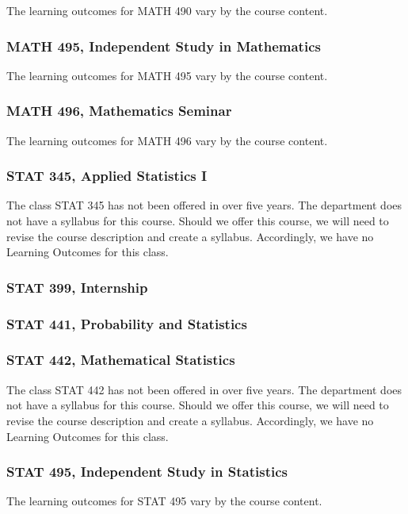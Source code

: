 \documentclass[11pt]{article}
\begin{document}
The learning outcomes for MATH 490 vary by the course content.

\subsubsection*{MATH 495, Independent Study in Mathematics}


The learning outcomes for MATH 495 vary by the course content.

\subsubsection*{MATH 496, Mathematics Seminar}

The learning outcomes for MATH 496 vary by the course content.


\subsubsection*{STAT 345, Applied Statistics I}

The class STAT 345 has not been offered in over five years.  The
department does not have a syllabus for this course. Should we offer this course,  we will need to revise
the course description and create a syllabus. Accordingly, we have no Learning Outcomes for this class.


\subsubsection*{STAT 399, Internship}

\subsubsection*{STAT 441, Probability and Statistics}


\subsubsection*{STAT 442, Mathematical Statistics}

The class STAT 442 has not been offered in over five years. The
department does not have a syllabus for this course. Should we offer this course,  we will need to revise
the course description and create a syllabus. Accordingly, we have no Learning Outcomes for this class.

\subsubsection*{STAT 495, Independent Study in Statistics}

The learning outcomes for STAT 495 vary by the course content.

\end{document}
